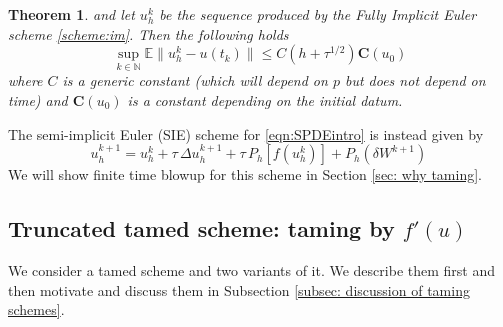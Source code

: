 \documentclass[reqno, 11pt]{amsart}
\theoremstyle{plain}
\newtheorem{theorem}{Theorem}[section]
\theoremstyle{definition}
\theoremstyle{remark}
\numberwithin{equation}{section}
\numberwithin{theorem}{section}
\newcommand{\N}{\mathbb{N}}
\newcommand{\con}{\mathbf{C}}
\begin{document}
{\begin{theorem}
    and let $u_h^k$ be the sequence produced by the Fully Implicit Euler scheme \eqref{scheme:im}. Then the following holds 
     \begin{equation}\label{eqn: UiT estimate fully implicit}
       \sup_{k \in \N } \mathbb E \|u_h^k - u(t_k)\| \leq C (h+ \tau^{1/2}) \con(u_0)
   \end{equation}
   where $C$ is a generic constant (which will depend on $p$ but does not depend on time) and
   $\con(u_0)$ is a constant depending on the initial datum. 
\end{theorem}
The semi-implicit Euler (SIE) scheme for \eqref{eqn:SPDEintro} is instead given by
\begin{equation}\label{scheme: general SIE}
u_h^{k+1} = u_h^{k} + \tau \,\Delta u_h^{k+1}  +
\tau \,P_h [f(u_h^{k})] + P_h (\delta W^{k+1}) \, 
\end{equation}
We will show finite time blowup for this scheme in Section \ref{sec: why taming}. 







\subsection{Truncated tamed scheme: taming by $f'(u)$}\label{subsec:truncated tamed}
We consider a tamed scheme and two variants of it. We describe them first and then motivate and discuss them in Subsection \ref{subsec: discussion of taming schemes}.






}
\end{document}

